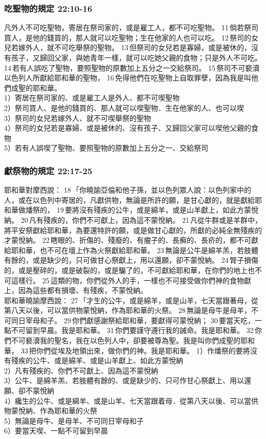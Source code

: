 \subsubsection{吃聖物的規定 22:10-16}
凡外人不可吃聖物，寄居在祭司家的，或是雇工人，都不可吃聖物。 11 倘若祭司買人，是他的錢買的，那人就可以吃聖物；生在他家的人也可以吃。 12 祭司的女兒若嫁外人，就不可吃舉祭的聖物。 13 但祭司的女兒若是寡婦，或是被休的，沒有孩子，又歸回父家，與她青年一樣，就可以吃她父親的食物；只是外人不可吃。 14 若有人誤吃了聖物，要照聖物的原數加上五分之一交給祭司。 15 祭司不可褻瀆以色列人所獻給耶和華的聖物， 16 免得他們在吃聖物上自取罪孽，因為我是叫他們成聖的耶和華。\\
1）寄居在祭司家的、或是雇工人是外人、都不可喫聖物\\
2）祭司買人、是他的錢買的、那人就可以喫聖物．生在他家的人、也可以喫\\
3）祭司的女兒若嫁外人、就不可喫舉祭的聖物\\
4）祭司的女兒若是寡婦、或是被休的、沒有孩子、又歸回父家可以喫他父親的食物\\
5）若有人誤喫了聖物、要照聖物的原數加上五分之一、交給祭司\\

\subsubsection{獻祭物的規定 22:17-25}
耶和華對摩西說： 18 「你曉諭亞倫和他子孫，並以色列眾人說：以色列家中的人，或在以色列中寄居的，凡獻供物，無論是所許的願，是甘心獻的，就是獻給耶和華做燔祭的， 19 要將沒有殘疾的公牛，或是綿羊，或是山羊獻上，如此方蒙悅納。 20 凡有殘疾的，你們不可獻上，因為這不蒙悅納。 21 凡從牛群或是羊群中，將平安祭獻給耶和華，為要還特許的願，或是做甘心獻的，所獻的必純全無殘疾的才蒙悅納。 22 瞎眼的、折傷的、殘廢的、有瘤子的、長癬的、長疥的，都不可獻給耶和華，也不可在壇上作為火祭獻給耶和華。 23 無論是公牛是綿羊羔，若肢體有餘的，或是缺少的，只可做甘心祭獻上，用以還願，卻不蒙悅納。 24 腎子損傷的，或是壓碎的，或是破裂的，或是騸了的，不可獻給耶和華，在你們的地上也不可這樣行。 25 這類的物，你們從外人的手，一樣也不可接受做你們神的食物獻上，因為這些都有損壞、有殘疾，不蒙悅納。\\
耶和華曉諭摩西說： 27 「才生的公牛，或是綿羊，或是山羊，七天當跟著母，從第八天以後，可以當供物蒙悅納，作為耶和華的火祭。 28 無論是母牛是母羊，不可同日宰母和子。 29 你們獻感謝祭給耶和華，要獻得可蒙悅納； 30 要當天吃，一點不可留到早晨。我是耶和華。 31 你們要謹守遵行我的誡命。我是耶和華。 32 你們不可褻瀆我的聖名，我在以色列人中，卻要被尊為聖。我是叫你們成聖的耶和華， 33 把你們從埃及地領出來，做你們的神。我是耶和華。
1）作燔祭的要將沒有殘疾的公牛、或是綿羊、或是山羊獻上、如此方蒙悅納\\
2）凡有殘疾的、你們不可獻上、因為這不蒙悅納\\
3）公牛、是綿羊羔、若肢體有餘的、或是缺少的、只可作甘心祭獻上、用以還願、卻不蒙悅納\\
4）纔生的公牛、或是綿羊、或是山羊、七天當跟着母．從第八天以後、可以當供物蒙悅納、作為耶和華的火祭\\
5）無論是母牛、是母羊、不可同日宰母和子\\
6）要當天喫、一點不可留到早晨 

